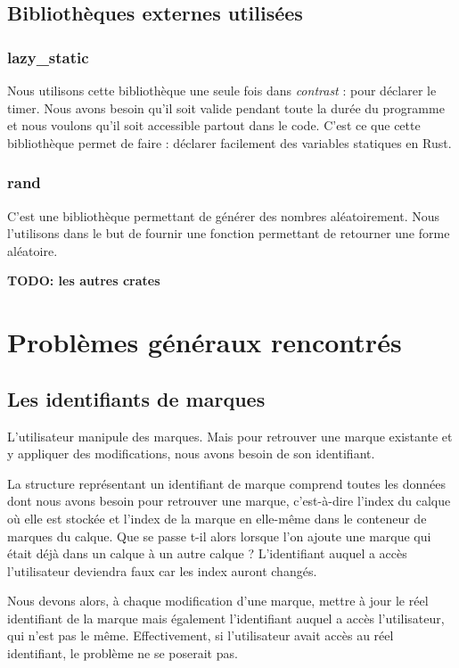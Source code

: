 \documentclass[12pt]{article}
\begin{document}
\subsection{Bibliothèques externes utilisées}
\subsubsection{lazy\_static}
Nous utilisons cette bibliothèque \cite{lazy-static} une seule fois dans 
\textit{contrast} : pour déclarer le timer. Nous avons besoin qu'il soit valide pendant 
toute la durée du programme et nous voulons qu'il soit accessible partout dans le code.
C'est ce que cette bibliothèque permet de faire : déclarer facilement des variables 
statiques en Rust.

\subsubsection{rand}
C'est une bibliothèque \cite{rand} permettant de générer des nombres aléatoirement. Nous 
l'utilisons dans le but de fournir une fonction permettant de retourner une forme 
aléatoire.

\textbf{TODO: les autres crates}

\section{Problèmes généraux rencontrés}
\subsection{Les identifiants de marques}

L'utilisateur manipule des marques. Mais pour retrouver une marque existante et y 
appliquer des modifications, nous avons besoin de son identifiant.

La structure représentant un identifiant de marque comprend toutes les données dont nous 
avons besoin pour retrouver une marque, c'est-à-dire l'index du calque où elle est 
stockée et l'index de la marque en elle-même dans le conteneur de marques du calque.
Que se passe t-il alors lorsque l'on ajoute une marque qui était déjà dans un calque à
un autre calque ? L'identifiant auquel a accès l'utilisateur deviendra faux car les index
auront changés.

Nous devons alors, à chaque modification d'une marque, mettre à jour le réel
identifiant de la marque mais également l'identifiant auquel a accès l'utilisateur, qui n'est pas le même.
Effectivement, si l'utilisateur avait accès au réel identifiant, le problème ne se
poserait pas.
\end{document}
